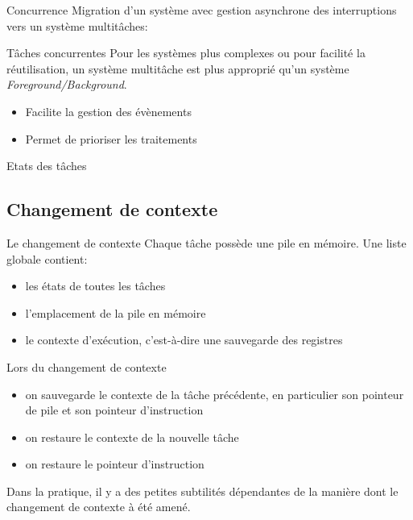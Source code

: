\begin{frame}{Concurrence}
  Migration d'un système avec gestion asynchrone des interruptions vers
  un système multitâches:
  \begin{center}
  \end{center}
\end{frame}

\begin{frame}{Tâches concurrentes}
  Pour les  systèmes plus complexes ou pour  facilité la réutilisation,
  un   système   multitâche   est   plus   approprié   qu'un   système
  \emph{Foreground/Background}.
  \begin{itemize}
  \item Facilite la gestion des évènements
  \item Permet de prioriser les traitements
  \end{itemize}
\end{frame}

\begin{frame}{Etats des tâches}
  \begin{center}
    
  \end{center}
\end{frame}


\subsection{Changement de contexte}

\begin{frame}{Le changement de contexte}
  Chaque tâche possède une pile en mémoire. Une liste globale contient:
  \begin{itemize}
  \item les états de toutes les tâches
  \item l'emplacement de la pile en mémoire
  \item le contexte d'exécution, c'est-à-dire une sauvegarde des registres
  \end{itemize}
  Lors du changement de contexte
  \begin{itemize}
  \item  on  sauvegarde  le   contexte  de  la  tâche  précédente,  en
    particulier son pointeur de pile et son pointeur d'instruction
  \item on restaure le contexte de la nouvelle tâche
  \item on restaure le pointeur d'instruction
  \end{itemize}
  Dans la  pratique, il y a  des petites subtilités  dépendantes de la
  manière dont le changement de contexte à été amené.
\end{frame}

